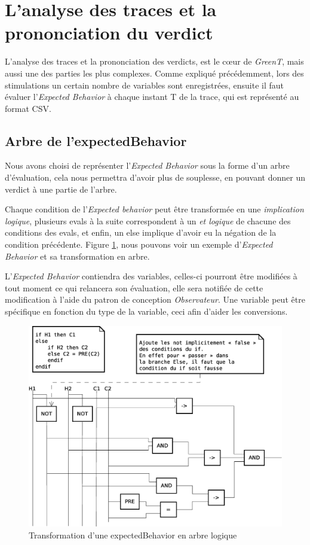 \section{L'analyse des traces et la prononciation du verdict}
	L'analyse des traces et la prononciation des verdicts, est le c\oe{}ur de \textit{GreenT}, mais aussi une des parties les plus complexes. Comme expliqué précédemment, lors des stimulations un certain nombre de variables sont enregistrées, ensuite il faut évaluer l'\textit{Expected Behavior} à chaque instant T de la trace, qui est représenté au format CSV. 

	\subsection{Arbre de l'expectedBehavior}
 	Nous avons choisi de représenter l'\textit{Expected Behavior} sous la forme d'un arbre d'évaluation, cela nous permettra d'avoir plus de souplesse, en pouvant donner un verdict à une partie de l'arbre.

 	Chaque condition de l'\textit{Expected behavior} peut être transformée en une \textit{implication logique}, plusieurs evals à la suite correspondent à un \textit{et logique} de chacune des conditions des evals, et enfin, un else implique d'avoir eu la négation de la condition précédente. Figure \ref{fig:diagLogique}, nous pouvons voir un exemple d'\textit{Expected Behavior} et sa transformation en arbre.


L'\textit{Expected Behavior} contiendra des variables, celles-ci pourront être modifiées à tout moment ce qui relancera son évaluation, elle sera notifiée de cette modification à l'aide du patron de conception \textit{Observateur}. Une variable peut être spécifique en fonction du type de la variable, ceci afin d'aider les conversions.

 	\begin{figure}[H]
 		\centering
 		\includegraphics[width=14cm]{contents/images/diagLogique.eps}
 		\caption{Transformation d'une expectedBehavior en arbre logique}
 		\label{fig:diagLogique}
 	\end{figure}

